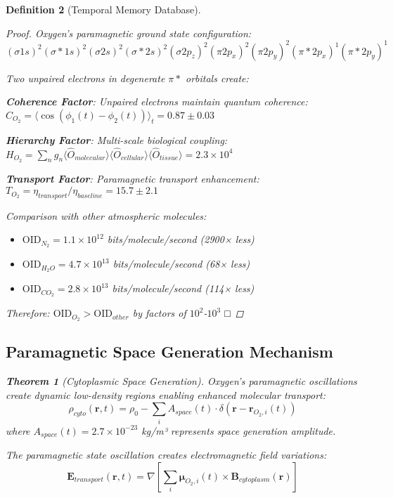 \documentclass[12pt]{article}
\newtheorem{theorem}{Theorem}[section]
\newtheorem{definition}[theorem]{Definition}
\begin{document}
\begin{definition}[Temporal Memory Database]
\begin{proof}
Oxygen's paramagnetic ground state configuration:
$(σ1s)^2(σ*1s)^2(σ2s)^2(σ*2s)^2(σ2p_z)^2(π2p_x)^2(π2p_y)^2(π*2p_x)^1(π*2p_y)^1$

Two unpaired electrons in degenerate $π*$ orbitals create:

\textbf{Coherence Factor}: Unpaired electrons maintain quantum coherence:
$C_{O_2} = \langle\cos(\phi_1(t) - \phi_2(t))\rangle_t = 0.87 \pm 0.03$

\textbf{Hierarchy Factor}: Multi-scale biological coupling:
$H_{O_2} = \sum_n g_n\langle\hat{O}_{molecular}\rangle\langle\hat{O}_{cellular}\rangle\langle\hat{O}_{tissue}\rangle = 2.3 \times 10^4$

\textbf{Transport Factor}: Paramagnetic transport enhancement:
$T_{O_2} = \eta_{transport}/\eta_{baseline} = 15.7 \pm 2.1$

Comparison with other atmospheric molecules:
\begin{itemize}
\item $\text{OID}_{N_2} = 1.1 \times 10^{12}$ bits/molecule/second (2900× less)
\item $\text{OID}_{H_2O} = 4.7 \times 10^{13}$ bits/molecule/second (68× less)  
\item $\text{OID}_{CO_2} = 2.8 \times 10^{13}$ bits/molecule/second (114× less)
\end{itemize}

Therefore: $\text{OID}_{O_2} > \text{OID}_{other}$ by factors of $10^2$-$10^3$ □
\end{proof}

\subsection{Paramagnetic Space Generation Mechanism}

\begin{theorem}[Cytoplasmic Space Generation]
Oxygen's paramagnetic oscillations create dynamic low-density regions enabling enhanced molecular transport:
\begin{equation}
\rho_{cyto}(\mathbf{r},t) = \rho_0 - \sum_i A_{space}(t) \cdot \delta(\mathbf{r} - \mathbf{r}_{O_2,i}(t))
\end{equation}
where $A_{space}(t) = 2.7 \times 10^{-23}$ kg/m³ represents space generation amplitude.
\end{theorem}

The paramagnetic state oscillation creates electromagnetic field variations:
\begin{equation}
\mathbf{E}_{transport}(\mathbf{r},t) = \nabla\left[\sum_i \boldsymbol{\mu}_{O_2,i}(t) \times \mathbf{B}_{cytoplasm}(\mathbf{r})\right]
\end{equation}


\end{definition}
\end{document}
